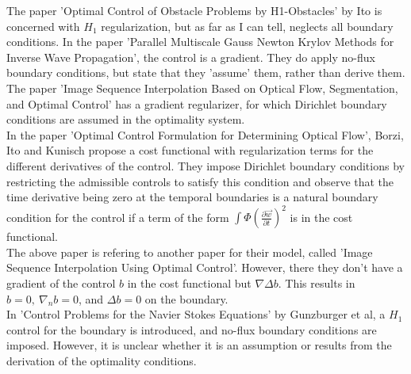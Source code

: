 \documentclass[11pt, a4paper]{article}
\theoremstyle{definition}
\begin{document}
The paper 'Optimal Control of Obstacle Problems by H1-Obstacles' by Ito is concerned with $H_1$ regularization, but as far as I can tell, neglects all boundary conditions.
In the paper 'Parallel Multiscale Gauss Newton Krylov Methods for Inverse Wave Propagation', the control is a gradient. They do apply no-flux boundary conditions, but state that they 'assume' them, rather than derive them.
The paper 'Image Sequence Interpolation Based on Optical Flow, Segmentation, and Optimal Control' has a gradient regularizer, for which Dirichlet boundary conditions are assumed in the optimality system.\\
In the paper 'Optimal Control Formulation for Determining Optical Flow', Borzi, Ito and Kunisch propose a cost functional with regularization terms for the different derivatives of the control. They impose Dirichlet boundary conditions by restricting the admissible controls to satisfy this condition and observe that the time derivative being zero at the temporal boundaries is a natural boundary condition for the control if a term of the form $\int \Phi \left( \frac{\partial \vec w}{\partial t}\right)^2$ is in the cost functional.\\
The above paper is refering to another paper for their model, called 'Image Sequence Interpolation Using Optimal Control'. However, there they don't have a gradient of the control $b$ in the cost functional but $\nabla \Delta b$. This results in $b = 0, \ \nabla_n b = 0$, and $\Delta b = 0$ on the boundary.
\\
In 'Control Problems for the Navier Stokes Equations' by Gunzburger et al, a $H_1$ control for the boundary is introduced, and no-flux boundary conditions are imposed. However, it is unclear whether it is an assumption or results from the derivation of the optimality conditions.
\end{document}
